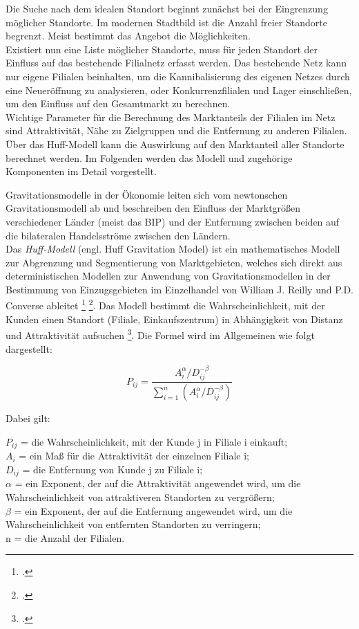 Die Suche nach dem idealen Standort beginnt zunächst bei der Eingrenzung möglicher Standorte.
Im modernen Stadtbild ist die Anzahl freier Standorte begrenzt.
Meist bestimmt das Angebot die Möglichkeiten.\\
Existiert nun eine Liste möglicher Standorte, muss für jeden Standort der Einfluss auf das bestehende Filialnetz erfasst werden.
Das bestehende Netz kann nur eigene Filialen beinhalten, um die Kannibalisierung des eigenen Netzes durch eine Neueröffnung zu analysieren, oder Konkurrenzfilialen und Lager einschließen, um den Einfluss auf den Gesamtmarkt zu berechnen.\\
Wichtige Parameter für die Berechnung des Marktanteils der Filialen im Netz sind Attraktivität, Nähe zu Zielgruppen und die Entfernung zu anderen Filialen.\\
Über das Huff-Modell kann die Auswirkung auf den Marktanteil aller Standorte berechnet werden.
Im Folgenden werden das Modell und zugehörige Komponenten im Detail vorgestellt.

Gravitationsmodelle in der Ökonomie leiten sich vom newtonschen Gravitationsmodell ab und beschreiben den Einfluss der Marktgrößen verschiedener Länder (meist das BIP) und der Entfernung zwischen beiden auf die bilateralen Handelsströme zwischen den Ländern.\\
Das \textit{Huff-Modell} (engl. Huff Gravitation Model) ist ein mathematisches Modell zur Abgrenzung und Segmentierung von Marktgebieten, welches sich direkt aus deterministischen Modellen zur Anwendung von Gravitationsmodellen in der Bestimmung von Einzugsgebieten im Einzelhandel von William J. Reilly und P.D. Converse ableitet \footcite{reilly_law_1931} \footcite{converse_new_1949}.
Das Modell bestimmt die Wahrscheinlichkeit, mit der Kunden einen Standort (Filiale, Einkaufszentrum) in Abhängigkeit von Distanz und Attraktivität aufsuchen \footcite{arcgis_funktionsweise_huff}. 
Die Formel wird im Allgemeinen wie folgt dargestellt:

\begin{equation}
	P_{i j}=\frac{A_{i}^{\alpha} / D_{i j}^{-\beta}}{\sum_{i=1}^{n}\left(A_{i}^{\alpha} / D_{i j}^{-\beta}\right)}
\end{equation}

Dabei gilt:

\( P_{i j} \) = die Wahrscheinlichkeit, mit der Kunde j in Filiale i einkauft;\\
\( A_{i} \) = ein Maß für die Attraktivität der einzelnen Filiale i;\\
\( D_{i j} \) = die Entfernung von Kunde j zu Filiale i;\\ 
\( \alpha \) = ein Exponent, der auf die Attraktivität angewendet wird, um die Wahrscheinlichkeit von attraktiveren Standorten zu vergrößern;\\ 
\( \beta \) = ein Exponent, der auf die Entfernung angewendet wird, um die Wahrscheinlichkeit von entfernten Standorten zu verringern;\\
n = die Anzahl der Filialen.

